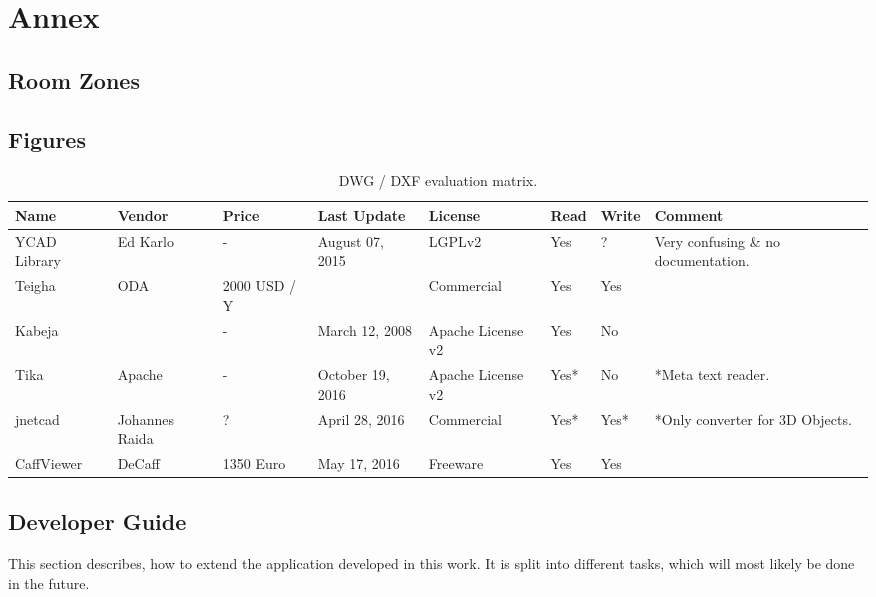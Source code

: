 \section{Annex}

\subsection{Room Zones}
\label{sub:RoomZones}


\subsection{Figures}
\begin{table}[h]
\centering
\caption{DWG / DXF evaluation matrix.}
\label{tbl:DWGEvaluationMatrix}
\begin{tabular}{@{}llllllll@{}}
\toprule
Name         & Vendor         & Price        & Last Update      & License           & Read & Write & Comment                             \\ \midrule
YCAD Library & Ed Karlo       & -            & August 07, 2015  & LGPLv2            & Yes  & ?     & Very confusing \& no documentation. \\
Teigha       & ODA            & 2000 USD / Y &                  & Commercial        & Yes  & Yes   &                                     \\
Kabeja       &                & -            & March 12, 2008   & Apache License v2 & Yes  & No    &                                     \\
Tika         & Apache         & -            & October 19, 2016 & Apache License v2 & Yes* & No    & *Meta text reader.                  \\
jnetcad      & Johannes Raida & ?            & April 28, 2016   & Commercial        & Yes* & Yes*  & *Only converter for 3D Objects.     \\
CaffViewer   & DeCaff         & 1350 Euro    & May 17, 2016     & Freeware          & Yes  & Yes   &                                     \\ \bottomrule
\end{tabular}
\end{table}

\pagebreak
\subsection{Developer Guide}
This section describes, how to extend the application developed in this work. It is split into different tasks, which will most likely be done in the future.

